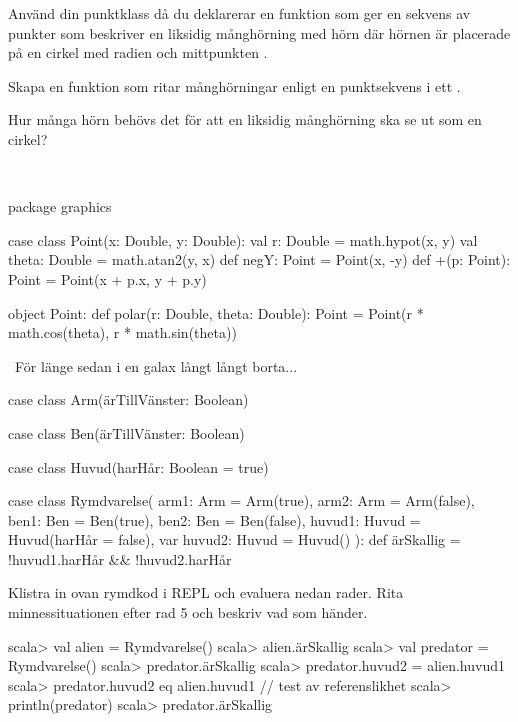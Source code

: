 \Subtask Använd din punktklass då du deklarerar en funktion  som ger en sekvens av punkter som beskriver en liksidig månghörning med  hörn där hörnen är placerade på en cirkel med radien  och mittpunkten .

\Subtask Skapa en funktion  som ritar månghörningar enligt en punktsekvens  i ett .

\Subtask Hur många hörn behövs det för att en liksidig månghörning ska se ut som en cirkel?

\SOLUTION

\TaskSolved \what~

\Subtask \begin{Code}
package graphics

case class Point(x: Double, y: Double):
  val r: Double          = math.hypot(x, y)
  val theta: Double      = math.atan2(y, x)
  def negY: Point        = Point(x, -y)
  def +(p: Point): Point = Point(x + p.x, y + p.y)

object Point:
  def polar(r: Double, theta: Double): Point =
    Point(r * math.cos(theta), r * math.sin(theta))
\end{Code}

\Subtask \TODO

\Subtask \TODO

\Subtask \TODO


\QUESTEND





\QUESTBEGIN

\Task  \what~För länge sedan i en galax långt långt borta...

\begin{Code}
case class Arm(ärTillVänster: Boolean)

case class Ben(ärTillVänster: Boolean)

case class Huvud(harHår: Boolean = true)

case class Rymdvarelse(
      arm1:   Arm   = Arm(true),
      arm2:   Arm   = Arm(false),
      ben1:   Ben   = Ben(true),
      ben2:   Ben   = Ben(false),
      huvud1: Huvud = Huvud(harHår = false),
  var huvud2: Huvud = Huvud()
):
  def ärSkallig = !huvud1.harHår && !huvud2.harHår
\end{Code}

\Subtask Klistra in ovan rymdkod i REPL och evaluera nedan rader. Rita minnessituationen efter rad 5 och beskriv vad som händer.
\begin{REPL}
scala> val alien = Rymdvarelse()
scala> alien.ärSkallig
scala> val predator = Rymdvarelse()
scala> predator.ärSkallig
scala> predator.huvud2 = alien.huvud1
scala> predator.huvud2 eq alien.huvud1  // test av referenslikhet
scala> println(predator)
scala> predator.ärSkallig
\end{REPL}

